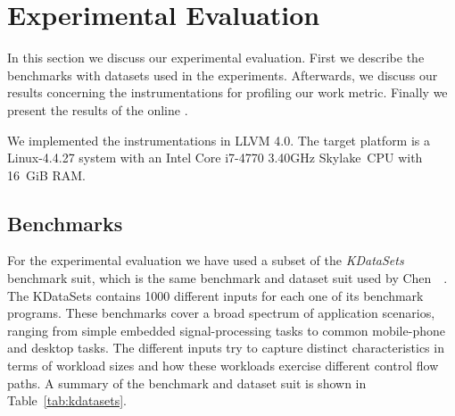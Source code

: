 
\chapter{Experimental Evaluation}

In this section we discuss our experimental evaluation.
First we describe the benchmarks with datasets used in the experiments.
Afterwards, we discuss our results concerning the instrumentations for profiling our work metric.
Finally we present the results of the online {\itercomp}.

We implemented the instrumentations in LLVM 4.0.
The target platform is a Linux-4.4.27 system with an Intel Core i7-4770 3.40GHz Skylake~CPU with 16~GiB RAM.

\section{Benchmarks}


For the experimental evaluation we have used a subset of the \textit{KDataSets} benchmark suit, which is the same benchmark and dataset suit used by Chen~\etal~\cite{chen10,chen12a}.
The KDataSets contains 1000 different inputs for each one of its benchmark programs.
These benchmarks cover a broad spectrum of application scenarios, ranging from simple embedded signal-processing tasks to common mobile-phone and desktop tasks.
The different inputs try to capture distinct characteristics in terms of workload sizes and how these workloads exercise different control flow paths.
A summary of the benchmark and dataset suit is shown in Table~\ref{tab:kdatasets}.

